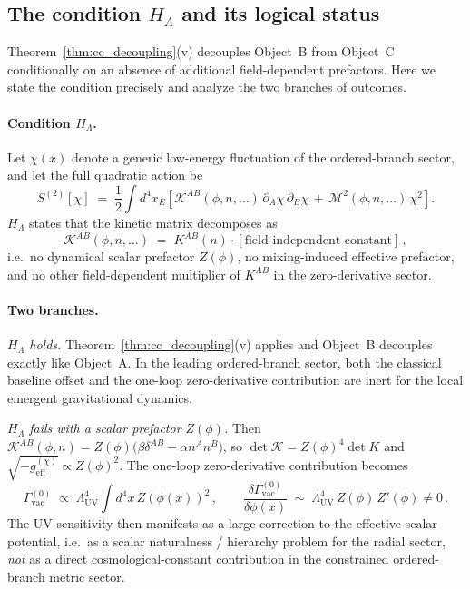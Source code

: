 \subsection{The condition $H_\Lambda$ and its logical status}
\label{subsec:Hlambda_cc}

Theorem~\ref{thm:cc_decoupling}(v) decouples Object~B from Object~C conditionally on an
absence of additional field-dependent prefactors. Here we state the
condition precisely and analyze the two branches of outcomes.

\paragraph{Condition $H_\Lambda$.} Let $\chi(x)$ denote a generic low-energy
fluctuation of the ordered-branch sector, and let the full quadratic
action be
\begin{equation}
S^{(2)}[\chi] \;=\; \frac{1}{2} \int d^4 x_E \left[
\mathcal{K}^{AB}(\phi, n, \ldots)\, \partial_A\chi\, \partial_B\chi
\,+\, \mathcal{M}^2(\phi, n, \ldots)\, \chi^2
\right].
\label{eq:full_quadratic_cc}
\end{equation}
\textbf{$H_\Lambda$} states that the kinetic matrix decomposes as
\begin{equation}
\mathcal{K}^{AB}(\phi, n, \ldots)
\;=\; K^{AB}(n) \cdot [\text{field-independent constant}]\,,
\label{eq:H1_cc}
\end{equation}
i.e.\ no dynamical scalar prefactor $Z(\phi)$, no mixing-induced
effective prefactor, and no other field-dependent multiplier of
$K^{AB}$ in the zero-derivative sector.
\paragraph{Two branches.}

\emph{$H_\Lambda$ holds.} Theorem~\ref{thm:cc_decoupling}(v) applies and Object~B decouples exactly
like Object~A. In the leading ordered-branch sector, both the classical
baseline offset and the one-loop zero-derivative contribution are
inert for the local emergent gravitational dynamics.

\emph{$H_\Lambda$ fails with a scalar prefactor $Z(\phi)$.} Then
$\mathcal{K}^{AB}(\phi,n) = Z(\phi)\bigl(\beta\delta^{AB} -
\alpha n^A n^B\bigr)$, so $\det\mathcal{K} = Z(\phi)^4\det K$ and
$\sqrt{-g_{\mathrm{eff}}^{(\chi)}} \propto Z(\phi)^2$. The one-loop
zero-derivative contribution becomes
\begin{equation}
\Gamma_{\mathrm{vac}}^{(0)} \;\propto\;
\Lambda_{\mathrm{UV}}^4 \int d^4 x\, Z(\phi(x))^2\,,
\qquad
\frac{\delta \Gamma_{\mathrm{vac}}^{(0)}}{\delta \phi(x)}
\;\sim\; \Lambda_{\mathrm{UV}}^4\, Z(\phi)\,Z'(\phi) \neq 0\,.
\label{eq:H1_broken_correction}
\end{equation}
The UV sensitivity then manifests as a large correction to the
effective scalar potential, i.e.\ as a scalar naturalness / hierarchy
problem for the radial sector, \emph{not} as a direct
cosmological-constant contribution in the constrained ordered-branch
metric sector.

